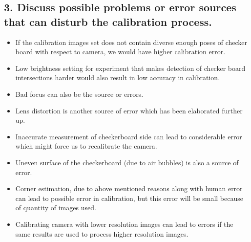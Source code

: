 \subsection*{3. Discuss possible problems or error sources that can disturb the calibration process.}
\begin{itemize}
\item If the calibration images set does not contain diverse enough poses of checker board with respect to camera, we would have higher calibration error.
\item Low brightness setting for experiment that makes detection of checker board intersections harder would also result in low accuracy in calibration.
\item Bad focus can also be the source or errors.
\item Lens distortion is another source of error which has been elaborated further up.
\item Inaccurate measurement of checkerboard side can lead to considerable error which might force us to recalibrate the camera. 
\item Uneven surface of the checkerboard (due to air bubbles) is also a source of error. 
\item Corner estimation, due to above mentioned reasons along with human error can lead to possible error in calibration, but this error will be small because of quantity of images used. 
\item Calibrating camera with lower resolution images can lead to errors if the same results are used to process higher resolution images. 
   
\end{itemize}


